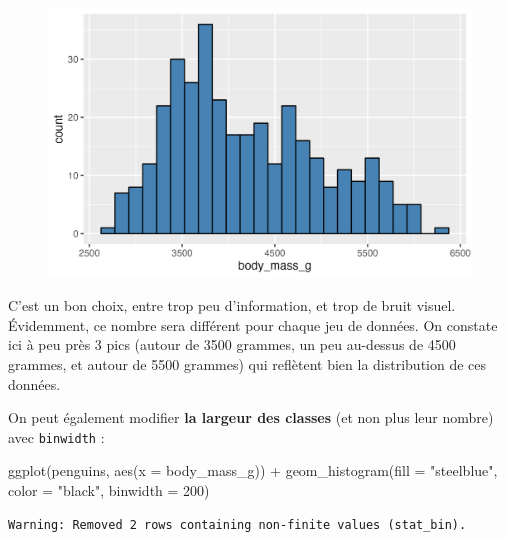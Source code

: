 \documentclass[
  letterpaper,
  DIV=11,
  numbers=noendperiod]{scrreprt}
\newenvironment{Shaded}{\begin{snugshade}}{\end{snugshade}}
\newcommand{\AttributeTok}[1]{\textcolor[rgb]{0.40,0.45,0.13}{#1}}
\newcommand{\DecValTok}[1]{\textcolor[rgb]{0.68,0.00,0.00}{#1}}
\newcommand{\FunctionTok}[1]{\textcolor[rgb]{0.28,0.35,0.67}{#1}}
\newcommand{\NormalTok}[1]{\textcolor[rgb]{0.00,0.23,0.31}{#1}}
\newcommand{\SpecialCharTok}[1]{\textcolor[rgb]{0.37,0.37,0.37}{#1}}
\newcommand{\StringTok}[1]{\textcolor[rgb]{0.13,0.47,0.30}{#1}}
\begin{document}
\begin{figure}[H]

{\centering \includegraphics{./03-visualization_files/figure-pdf/unnamed-chunk-15-1.png}

}

\end{figure}

C'est un bon choix, entre trop peu d'information, et trop de bruit
visuel. Évidemment, ce nombre sera différent pour chaque jeu de données.
On constate ici à peu près 3 pics (autour de 3500 grammes, un peu
au-dessus de 4500 grammes, et autour de 5500 grammes) qui reflètent bien
la distribution de ces données.

On peut également modifier \textbf{la largeur des classes} (et non plus
leur nombre) avec \texttt{binwidth} :

\begin{Shaded}
\begin{Highlighting}[]
\FunctionTok{ggplot}\NormalTok{(penguins, }\FunctionTok{aes}\NormalTok{(}\AttributeTok{x =}\NormalTok{ body\_mass\_g)) }\SpecialCharTok{+}
  \FunctionTok{geom\_histogram}\NormalTok{(}\AttributeTok{fill =} \StringTok{"steelblue"}\NormalTok{, }\AttributeTok{color =} \StringTok{"black"}\NormalTok{,}
                 \AttributeTok{binwidth =} \DecValTok{200}\NormalTok{)}
\end{Highlighting}
\end{Shaded}

\begin{verbatim}
Warning: Removed 2 rows containing non-finite values (stat_bin).
\end{verbatim}
\end{document}
